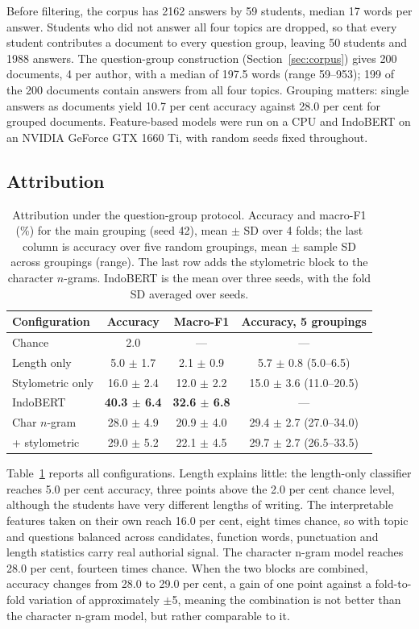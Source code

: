 \documentclass[runningheads]{llncs}
\begin{document}
Before filtering, the corpus has 2162 answers by 59 students, median 17 words per answer. Students who did not answer all four topics are dropped, so that every student contributes a document to every question group, leaving 50 students and 1988 answers. The question-group construction (Section~\ref{sec:corpus}) gives 200 documents, 4 per author, with a median of 197.5 words (range 59--953); 199 of the 200 documents contain answers from all four topics. Grouping matters: single answers as documents yield 10.7 per cent accuracy against 28.0 per cent for grouped documents. Feature-based models were run on a CPU and IndoBERT on an NVIDIA GeForce GTX 1660 Ti, with random seeds fixed throughout.

\subsection{Attribution}

\begin{table}[t]
\caption{Attribution under the question-group protocol. Accuracy and macro-F1 (\%) for the main grouping (seed 42), mean $\pm$ SD over 4 folds; the last column is accuracy over five random groupings, mean $\pm$ sample SD across groupings (range). The last row adds the stylometric block to the character $n$-grams. IndoBERT is the mean over three seeds, with the fold SD averaged over seeds.}
\label{tab:main}
\centering
\footnotesize
\setlength{\tabcolsep}{3pt}
\begin{tabular}{@{}lccc@{}}
\toprule
Configuration & Accuracy & Macro-F1 & Accuracy, 5 groupings \\
\midrule
Chance             & 2.0 & --- & --- \\
Length only        & 5.0 $\pm$ 1.7 & 2.1 $\pm$ 0.9 & 5.7 $\pm$ 0.8 (5.0--6.5) \\
Stylometric only   & 16.0 $\pm$ 2.4 & 12.0 $\pm$ 2.2 & 15.0 $\pm$ 3.6 (11.0--20.5) \\
IndoBERT           & \textbf{40.3 $\pm$ 6.4} & \textbf{32.6 $\pm$ 6.8} & --- \\
Char $n$-gram      & 28.0 $\pm$ 4.9 & 20.9 $\pm$ 4.0 & 29.4 $\pm$ 2.7 (27.0--34.0) \\
\quad + stylometric & 29.0 $\pm$ 5.2 & 22.1 $\pm$ 4.5 & 29.7 $\pm$ 2.7 (26.5--33.5) \\
\bottomrule
\end{tabular}
\end{table}

Table~\ref{tab:main} reports all configurations. Length explains little: the length-only classifier reaches 5.0 per cent accuracy, three points above the 2.0 per cent chance level, although the students have very different lengths of writing. The interpretable features taken on their own reach 16.0 per cent, eight times chance, so with topic and questions balanced across candidates, function words, punctuation and length statistics carry real authorial signal. The character n-gram model reaches 28.0 per cent, fourteen times chance. When the two blocks are combined, accuracy changes from 28.0 to 29.0 per cent, a gain of one point against a fold-to-fold variation of approximately $\pm$5, meaning the combination is not better than the character n-gram model, but rather comparable to it.
\end{document}
